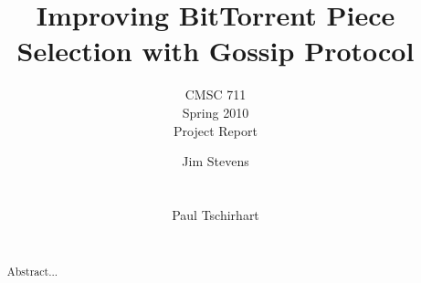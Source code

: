\documentclass[twocolumn]{sig-alternate}
\begin{document}
\title{Improving BitTorrent Piece Selection with Gossip Protocol}

\subtitle{CMSC 711 \\ Spring 2010 \\ Project Report}

\author{ 
\alignauthor
Jim Stevens\\
	\\
	\\
\alignauthor
Paul Tschirhart\\
	\\
}

\maketitle


\begin{abstract}
Abstract...
\end{abstract}






\end{document}
